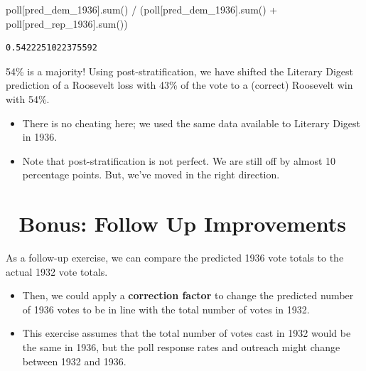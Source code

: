 \documentclass[
  letterpaper,
  DIV=11,
  numbers=noendperiod]{scrreprt}
\newenvironment{Shaded}{\begin{snugshade}}{\end{snugshade}}
\newcommand{\BuiltInTok}[1]{\textcolor[rgb]{0.00,0.23,0.31}{#1}}
\newcommand{\NormalTok}[1]{\textcolor[rgb]{0.00,0.23,0.31}{#1}}
\newcommand{\OperatorTok}[1]{\textcolor[rgb]{0.37,0.37,0.37}{#1}}
\newcommand{\StringTok}[1]{\textcolor[rgb]{0.13,0.47,0.30}{#1}}
\begin{document}
\begin{Shaded}
\begin{Highlighting}[]
\NormalTok{poll[}\StringTok{\textquotesingle{}pred\_dem\_1936\textquotesingle{}}\NormalTok{].}\BuiltInTok{sum}\NormalTok{() }\OperatorTok{/}\NormalTok{ (poll[}\StringTok{\textquotesingle{}pred\_dem\_1936\textquotesingle{}}\NormalTok{].}\BuiltInTok{sum}\NormalTok{() }\OperatorTok{+}\NormalTok{ poll[}\StringTok{\textquotesingle{}pred\_rep\_1936\textquotesingle{}}\NormalTok{].}\BuiltInTok{sum}\NormalTok{())}
\end{Highlighting}
\end{Shaded}

\begin{verbatim}
0.5422251022375592
\end{verbatim}

54\% is a majority! Using post-stratification, we have shifted the
Literary Digest prediction of a Roosevelt loss with 43\% of the vote to
a (correct) Roosevelt win with 54\%.

\begin{itemize}
\item
  There is no cheating here; we used the same data available to Literary
  Digest in 1936.
\item
  Note that post-stratification is not perfect. We are still off by
  almost 10 percentage points. But, we've moved in the right direction.
\end{itemize}

\section{🎁 Bonus: Follow Up
Improvements}\label{bonus-follow-up-improvements}

As a follow-up exercise, we can compare the predicted 1936 vote totals
to the actual 1932 vote totals.

\begin{itemize}
\item
  Then, we could apply a \textbf{correction factor} to change the
  predicted number of 1936 votes to be in line with the total number of
  votes in 1932.
\item
  This exercise assumes that the total number of votes cast in 1932
  would be the same in 1936, but the poll response rates and outreach
  might change between 1932 and 1936.
\end{itemize}
\end{document}
